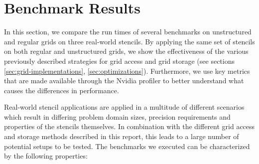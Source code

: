 \chapter{Benchmark Results}    \label{sec:results}

In this section, we compare the run times of several benchmarks on unstructured and regular grids on three real-world stencils. By applying the same set of stencils on both regular and unstructured grids, we show the effectiveness of the various previously described strategies for grid access and grid storage (see sections \ref{sec:grid-implementations}, \ref{sec:optimizations}). Furthermore, we use key metrics that are made available through the Nvidia profiler to better understand what causes the differences in performance.

Real-world stencil applications are applied in a multitude of different scenarios which result in differing problem domain sizes, precision requirements and properties of the stencils themselves. In combination with the different grid access and storage methods described in this report, this leads to a large number of potential setups to be tested. The benchmarks we executed can be characterized by the following properties:

